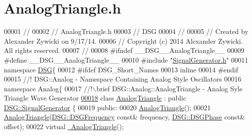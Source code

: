 \hypertarget{_analog_triangle_8h_source}{\section{Analog\+Triangle.\+h}
\label{_analog_triangle_8h_source}
}

\begin{DoxyCode}
00001 \textcolor{comment}{//}
00002 \textcolor{comment}{//  AnalogTriangle.h}
00003 \textcolor{comment}{//  DSG}
00004 \textcolor{comment}{//}
00005 \textcolor{comment}{//  Created by Alexander Zywicki on 9/17/14.}
00006 \textcolor{comment}{//  Copyright (c) 2014 Alexander Zywicki. All rights reserved.}
00007 \textcolor{comment}{//}
00008 \textcolor{preprocessor}{#ifndef \_\_DSG\_\_AnalogTriangle\_\_}
00009 \textcolor{preprocessor}{#define \_\_DSG\_\_AnalogTriangle\_\_}
00010 \textcolor{preprocessor}{#include "\hyperlink{_signal_generator_8h}{SignalGenerator.h}"}
00011 \textcolor{keyword}{namespace }\hyperlink{namespace_d_s_g}{DSG}\{
00012 \textcolor{preprocessor}{#ifdef DSG\_Short\_Names}
00013     \textcolor{keyword}{inline}
00014 \textcolor{preprocessor}{#endif}
00015 \textcolor{comment}{    //! DSG::Analog - Namespace Containing Analog Style Oscillators}
00016 \textcolor{comment}{}    \textcolor{keyword}{namespace }Analog\{\textcolor{comment}{}
00017 \textcolor{comment}{        //!\(\backslash\)brief DSG::Analog::AnalogTriangle - Analog Syle Triangle Wave Generator}
\hypertarget{_analog_triangle_8h_source_l00018}{}\hyperlink{class_d_s_g_1_1_analog_1_1_analog_triangle}{00018} \textcolor{comment}{}        \textcolor{keyword}{class }\hyperlink{class_d_s_g_1_1_analog_1_1_analog_triangle}{AnalogTriangle} : \textcolor{keyword}{public} \hyperlink{class_d_s_g_1_1_signal_generator}{DSG::SignalGenerator} \{
00019         \textcolor{keyword}{public}:
00020             \hyperlink{class_d_s_g_1_1_analog_1_1_analog_triangle_a2fe1a7a29eb9472323a2a1c0d0696e55}{AnalogTriangle}();
00021             \hyperlink{class_d_s_g_1_1_analog_1_1_analog_triangle_a2fe1a7a29eb9472323a2a1c0d0696e55}{AnalogTriangle}(\hyperlink{namespace_d_s_g_a4315a061386fa1014fda09b15d3a6973}{DSG::DSGFrequency} \textcolor{keyword}{const}& frequency,
      \hyperlink{namespace_d_s_g_a44431ce1eb0a7300efdd207bc879e52c}{DSG::DSGPhase} \textcolor{keyword}{const}& offset);
00022             \textcolor{keyword}{virtual} \hyperlink{class_d_s_g_1_1_analog_1_1_analog_triangle_af6e127d2fb623afad9b172e7c8b3c656}{~AnalogTriangle}();

\end{DoxyCode}
